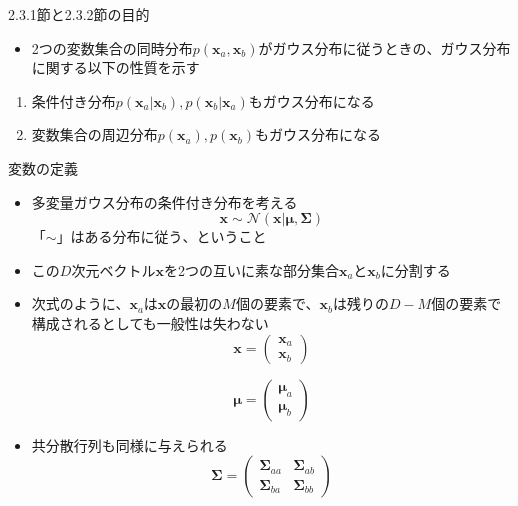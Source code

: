 \begin{frame}{2.3.1節と2.3.2節の目的}
 \begin{itemize}
  \item 2つの変数集合の同時分布$p(\bm{x}_a,\bm{x}_b)$がガウス分布に従うときの、ガウス分布に関する以下の性質を示す
 \end{itemize}
 \begin{enumerate}
  \item 条件付き分布$p(\bm{x}_a|\bm{x}_b),p(\bm{x}_b|\bm{x}_a)$もガウス分布になる
  \item 変数集合の周辺分布$p(\bm{x}_a),p(\bm{x}_b)$もガウス分布になる
 \end{enumerate}
\end{frame}

\begin{frame}{変数の定義}
 \begin{itemize}
  \item 多変量ガウス分布の条件付き分布を考える
        \begin{equation}
         \bm{x}\sim \mathcal{N}(\bm{x}|\bm{\mu}, \bm{\Sigma})
        \end{equation}
        「$\sim$」はある分布に従う、ということ
  \item この$D$次元ベクトル$\bm{x}$を2つの互いに素な部分集合$\bm{x}_a$と$\bm{x}_b$に分割する
  \item 次式のように、$\bm{x}_a$は$\bm{x}$の最初の$M$個の要素で、$\bm{x}_b$は残りの$D-M$個の要素で構成されるとしても一般性は失わない
        \begin{equation}
         \bm{x} =
          \begin{pmatrix}
           \bm{x}_a \\
           \bm{x}_b
          \end{pmatrix}
        \end{equation}

        \begin{equation}
         \bm{\mu} =
          \begin{pmatrix}
           \bm{\mu}_a \\
           \bm{\mu}_b
          \end{pmatrix}
        \end{equation}
  \item 共分散行列も同様に与えられる
        \begin{equation}
         \bm{\Sigma} =
          \begin{pmatrix}
           \bm{\Sigma}_{aa} & \bm{\Sigma}_{ab} \\
           \bm{\Sigma}_{ba} & \bm{\Sigma}_{bb}
          \end{pmatrix}
        \end{equation}
 \end{itemize}
\end{frame}

